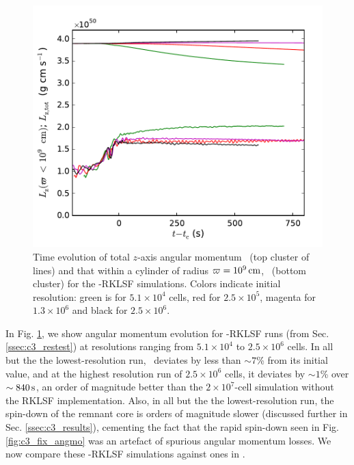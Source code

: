 \begin{figure}
\centering
\includegraphics[angle=0,width=0.6\columnwidth]{chapter3_zhu+u/figures/lz_development2.pdf}
\caption{Time evolution of total $z$-axis angular momentum \Lztot\ (top cluster of lines) and that within a cylinder of radius $\varpi = 10^9\,\mathrm{cm}$, \Lzinner\ (bottom cluster) for the \arepo-RKLSF simulations.  Colors indicate initial resolution: green is for $5.1\times10^4$ cells, red for $2.5\times10^{5}$, magenta for $1.3\times10^{6}$ and black for $2.5\times10^6$.}
\label{fig:c3_fix_angmo_nar}
\end{figure}

In Fig. \ref{fig:c3_fix_angmo_nar}, we show angular momentum evolution for \arepo-RKLSF runs (from Sec. \ref{ssec:c3_restest}) at resolutions ranging from $5.1\times10^4$ to $2.5\times10^6$ cells.  In all but the the lowest-resolution run, \Lztot\ deviates by less than $\sim7$\% from its initial value, and at the highest resolution run of $2.5\times10^6$ cells, it deviates by $\sim1$\% over $\sim840\,\mathrm{s}$, an order of magnitude better than the $2\times10^7$-cell simulation without the RKLSF implementation.  Also, in all but the the lowest-resolution run, the spin-down of the remnant core is orders of magnitude slower (discussed further in Sec. \ref{ssec:c3_results}), cementing the fact that the rapid spin-down seen in Fig. \ref{fig:c3_fix_angmo} was an artefact of spurious angular momentum losses.  We now compare these \arepo-RKLSF simulations against ones in \gasoline.


